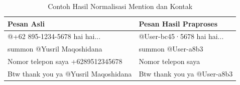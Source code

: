 \begingroup
\renewcommand{\arraystretch}{1}
\begin{table}[H]
\centering
\caption{Contoh Hasil Normalisasi Mention dan Kontak}
\label{tab:normalize-mention}
\scriptsize
\begin{tabular}{p{5.5cm} p{5.5cm}}
\toprule
\textbf{Pesan Asli} & \textbf{Pesan Hasil Praproses} \\
\midrule
@+62 895-1234-5678 hai hai... &
@User-bc45·5678 hai hai... \\

summon @Yusril Maqoshidana &
summon @User-a8b3 \\

Nomor telepon saya +6289512345678 &
Nomor telepon saya \\

Btw thank you ya @Yusril Maqoshidana &
Btw thank you ya @User-a8b3 \\
\bottomrule
\end{tabular}
\end{table}
\endgroup